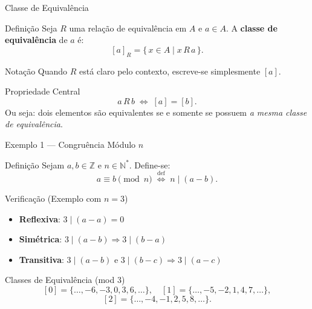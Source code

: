 \documentclass[9pt]{beamer}
\begin{document}
\begin{frame}{Classe de Equivalência}

\begin{block}{Definição}
Seja $R$ uma relação de equivalência em $A$ e $a \in A$.
A \textbf{classe de equivalência} de $a$ é:
\[
[a]_R = \{\,x \in A \mid x\,R\,a\,\}.
\]
\end{block}

\begin{block}{Notação}
Quando $R$ está claro pelo contexto, escreve-se simplesmente $[a]$.
\end{block}

\begin{block}{Propriedade Central}
\[
a\,R\,b \;\Longleftrightarrow\; [a] = [b].
\]
Ou seja: dois elementos são equivalentes se e somente se possuem \emph{a mesma classe de equivalência}.
\end{block}

\end{frame}

\begin{frame}{Exemplo 1 — Congruência Módulo $n$}

\begin{block}{Definição}
Sejam $a, b \in \mathbb{Z}$ e $n \in \mathbb{N}^*$. Define-se:
\[
a \equiv b \pmod{n}
\;\stackrel{\text{def}}{\Longleftrightarrow}\;
n \mid (a - b).
\]
\end{block}

\begin{block}{Verificação (Exemplo com $n = 3$)}
\begin{itemize}
  \item \textbf{Reflexiva}: $3 \mid (a - a) = 0$ \checkmark
  \item \textbf{Simétrica}: $3 \mid (a-b) \Rightarrow 3 \mid (b-a)$ \checkmark
  \item \textbf{Transitiva}: $3 \mid (a-b)$ e $3 \mid (b-c) \Rightarrow 3 \mid (a-c)$ \checkmark
\end{itemize}
\end{block}

\begin{block}{Classes de Equivalência (mod 3)}
\[
[0] = \{\dots, -6,-3,0,3,6,\dots\}, \quad [1] = \{\dots,-5,-2,1,4,7,\dots\},
\]
\[
[2] = \{\dots,-4,-1,2,5,8,\dots\}.
\]
\end{block}

\end{frame}
\end{document}
